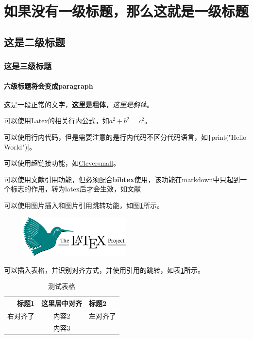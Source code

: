 \documentclass{ctexart} %
\begin{document}
\section{如果没有一级标题，那么这就是一级标题}

\subsection{这是二级标题}

\subsubsection{这是三级标题}

\paragraph{六级标题将会变成paragraph}

这是一段正常的文字，\textbf{这里是粗体}，\textit{这里是斜体}。

可以使用Latex的相关行内公式，如$a^2+b^2=c^2$。

可以使用行内代码，但是需要注意的是行内代码不区分代码语言，如\texttt|print("Hello World")|。

可以使用超链接功能，如\href{https://www.cleversmall.com}{Cleversmall}。

可以使用文献引用功能，但必须配合\textbf{bibtex}使用，该功能在markdown中只起到一个标志的作用，转为latex后才会生效，如文献\cite{name2024paper}

可以使用图片插入和图片引用跳转功能，如图\ref{fig1}所示。

\begin{figure}[ht]
    \centering
    \includegraphics[width=0.50\textwidth]{./figure/latex_bird.png}
    \label{fig1}
\end{figure}

可以插入表格，并识别对齐方式，并使用引用的跳转，如表\ref{tab1}所示。

\begin{table}[ht]
    \centering
    \caption{测试表格}
    \begin{tabular}{rcl}
        \toprule
        \textbf{标题1}&\textbf{这里居中对齐}&\textbf{标题2} \\
        \midrule
          右对齐了  &     内容2      &  左对齐了   \\
                    &     内容3      &             \\
        \bottomrule
    \end{tabular}
    \label{tab1}
\end{table}
\end{document}
